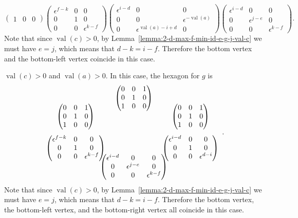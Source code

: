 \documentclass{amsart}
\theoremstyle{definition}
\def\e{\epsilon}
\def\val{\mathop{\mathrm{val}}}
\def\heximages#1#2#3#4#5#6{
  \heximagessqueezedcarefully{1.7em}{-1em}{#1}{#2}{#3}{#4}{#5}{#6}
}
\def\heximagessqueezedcarefully#1#2#3#4#5#6#7#8{
  \begin{array}{ccc}
    & #3 & \\[#2]
    #5 \hspace{-#1} & & \hspace{-#1} #4 \\[2em]
    #6 \hspace{-#1} & & \hspace{-#1} #7 \\[#2]
    & #8 &
  \end{array}
}
\newenvironment{caselist}
	       {\begin{list}{\underline{Case \arabic{enumi}}:}
		   {\usecounter{enumi}
		     \setlength{\itemindent}{0.5in}
		     \setlength{\leftmargin}{0in}
		     \setlength{\rightmargin}{0in}
	       }}
	       {\end{list}}
\begin{document}
\begin{caselist}
\begin{equation*}
{\begin{pmatrix}
		1 & 0 & 0 
	    \end{pmatrix}}
	    {\begin{pmatrix}
		\e^{f-k} & 0 & 0 \\
		0 & 1 & 0 \\
		0 & 0 & \e^{k-f} 
	    \end{pmatrix}}
	    {\begin{pmatrix}
		\e^{i-d}  & 0 & 0 \\
		0 & 0 & \e^{-\val(a)} \\
		0 & \e^{\val(a) - i + d} & 0  
	    \end{pmatrix}}
	    {\begin{pmatrix}
		\e^{i-d} & 0 & 0 \\
		0 & \e^{j-e} & 0 \\
		0 & 0 & \e^{k-f} 
	    \end{pmatrix}}.
      \end{equation*}
      Note that since $\val(c) > 0$, by
      Lemma~\ref{lemma:2-d-max-f-min-id-e-g-j-val-c} we must have $e = j$,
      which means that $d-k = i-f$.  Therefore the bottom vertex and the
      bottom-left vertex coincide in this case.
    \item $\val(c) > 0$ and $\val(a) > 0$.  In this case, the hexagon for $g$
      is
      \begin{equation*}
	\heximages
	    {\begin{pmatrix}
		0 & 0 & 1 \\
		0 & 1 & 0 \\
		1 & 0 & 0 
	    \end{pmatrix}}
	    {\begin{pmatrix}
		0 & 0 & 1 \\
		0 & 1 & 0 \\
		1 & 0 & 0 
	    \end{pmatrix}}
	    {\begin{pmatrix}
		0 & 0 & 1 \\
		0 & 1 & 0 \\
		1 & 0 & 0 
	    \end{pmatrix}}
	    {\begin{pmatrix}
		\e^{f-k} & 0 & 0 \\
		0 & 1 & 0 \\
		0 & 0 & \e^{k-f} 
	    \end{pmatrix}}
	    {\begin{pmatrix}
		\e^{i-d} & 0 & 0 \\
		0 & 1 & 0 \\
		0 & 0 & \e^{d-i} 
	    \end{pmatrix}}
	    {\begin{pmatrix}
		\e^{i-d} & 0 & 0 \\
		0 & \e^{j-e} & 0 \\
		0 & 0 & \e^{k-f} 
	    \end{pmatrix}}.
      \end{equation*}
      Note that since $\val(c) > 0$, by
      Lemma~\ref{lemma:2-d-max-f-min-id-e-g-j-val-c} we must have $e = j$,
      which means that $d-k = i-f$.  Therefore the bottom vertex, the
      bottom-left vertex, and the bottom-right vertex all coincide in this
      case.
  \end{caselist}
\end{document}
